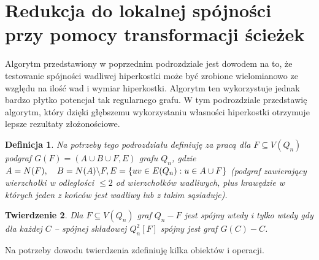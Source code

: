 \documentclass{pracamgr}
\newtheorem{theorem}{Twierdzenie}[chapter]
\newtheorem{defi}[theorem]{Definicja}
\begin{document}
  \section{Redukcja do lokalnej spójności przy pomocy transformacji ścieżek}\label{spojnosc 2}
   Algorytm przedstawiony w poprzednim podrozdziale jest dowodem na to, że testowanie spójności wadliwej hiperkostki może być zrobione wielomianowo
   ze względu na ilość wad i wymiar hiperkostki. Algorytm ten wykorzystuje jednak bardzo płytko potencjał tak regularnego grafu.
   W tym podrozdziale przedstawię algorytm, który dzięki głębszemu wykorzystaniu własności hiperkostki otrzymuje lepsze rezultaty złożonościowe.
   \begin{defi}\label{podgrafy kostki}
    Na potrzeby tego podrozdziału definiuję za pracą \cite{DFGKR} dla $F\subseteq V(Q_n)$\newline
    podgraf $G(F)=(A\cup B\cup F,E)$ grafu $Q_n$,
    gdzie $A=N(F),\quad B=N(A)\backslash F,\newline E=\{uv\in E(Q_n):u\in A\cup F\}$ (podgraf zawierający wierzchołki w odległości $\le 2$ od wierzchołków wadliwych,
    plus krawędzie w których jeden z końców jest wadliwy lub z takim sąsiaduje).
   \end{defi}
   \begin{theorem}\label{spojnosc z lokalnej spojnosci}
    Dla $F\subseteq V(Q_n)$ graf $Q_n-F$ jest spójny wtedy i tylko wtedy gdy dla każdej $C$ -- spójnej składowej $Q_n^2[F]$ spójny jest graf $G(C)-C$.
   \end{theorem}
   Na potrzeby dowodu twierdzenia zdefiniuję kilka obiektów i operacji.
\end{document}
